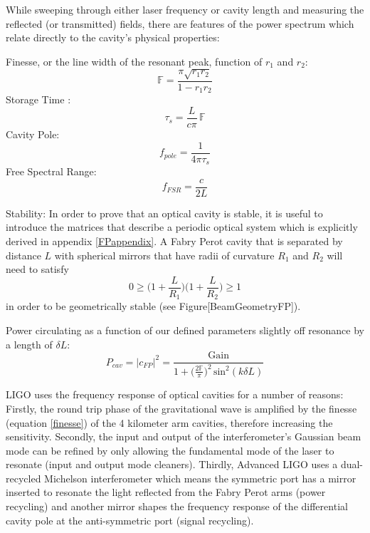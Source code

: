 		While sweeping through either laser frequency or cavity length and measuring the reflected (or transmitted) fields, there are features of the power spectrum which relate directly to the cavity's physical properties:
		
		Finesse, or the line width of the resonant peak, function of $r_1$ and $r_2$:
		\begin{equation}\label{finesse}
		\mathbb{F} = \frac{\pi \sqrt{r_1 r_2}}{1- r_1 r_2}
		\end{equation}
		Storage Time :
		\begin{equation}
		\tau_{s} = \frac{L}{c \pi} \, \mathbb{F}
		\end{equation}
		Cavity Pole:
		\begin{equation}
		f_{pole} = \frac{1}{4\pi \tau_{s}}
		\end{equation}
		Free Spectral Range:
		\begin{equation}
		f_{FSR}  = \frac{c}{2L}
		\end{equation}

		Stability: In order to prove that an optical cavity is stable, it is useful to introduce the matrices that describe a periodic optical system which is explicitly derived in appendix \ref{FPappendix}.  A Fabry Perot cavity that is separated by distance $L$ with spherical mirrors that have radii of curvature $R_1$ and $R_2$ will need to satisfy 
		\begin{equation}\label{gfactor}
		0 \geq \bigg(1+\frac{L}{R_1}\bigg) \bigg(1+\frac{L}{R_2}\bigg) \geq 1
		\end{equation}
		in order to be geometrically stable (see Figure[BeamGeometryFP]).
		
		Power circulating as a function of our defined parameters slightly off resonance by a length of $\delta L$:
		\begin{equation}
		P_{cav} = \vert c_{FP} \vert^2 = \frac{\text{Gain}}{ 1 + \big(\frac{2\mathbb{F}}{\pi} \big)^2 \, \text{sin}^2(k \delta L) }
		\end{equation}
		
		LIGO uses the frequency response of optical cavities for a number of reasons: Firstly, the round trip phase of the gravitational wave is amplified by the finesse (equation \ref{finesse}) of the 4 kilometer arm cavities, therefore increasing the sensitivity.  Secondly, the input and output of the interferometer's Gaussian beam mode can be refined by only allowing the fundamental mode of the laser to resonate (input and output mode cleaners).  Thirdly, Advanced LIGO uses a dual-recycled Michelson interferometer which means the symmetric port has a mirror inserted to resonate the light reflected from the Fabry Perot arms (power recycling) and another mirror shapes the frequency response of the differential cavity pole at the anti-symmetric port (signal recycling).
